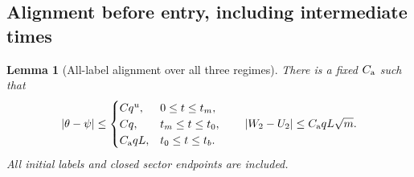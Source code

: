 \documentclass[11pt]{article}
\numberwithin{equation}{section}
\newtheorem{lemma}[theorem]{Lemma}
\theoremstyle{remark}\newtheorem{remark}[theorem]{Remark}
\begin{document}
\subsection{Alignment before entry, including intermediate times}
\begin{lemma}[All-label alignment over all three regimes]
\label{an07psev1:alignment}
There is a fixed \(C_{\rm a}\) such that
\[
 |\theta-\psi|\le
 \begin{cases}
 Cq^u,&0\le t\le t_m,\\
 Cq,&t_m\le t\le t_0,\\
 C_{\rm a}qL,&t_0\le t\le t_b .
 \end{cases}
 \qquad
 |W_2-U_2|\le C_{\rm a}qL\sqrt m .
 \label{an07psev1:alignmentbounds}
 \]
All initial labels and closed sector endpoints are included.
\end{lemma}
\end{document}
